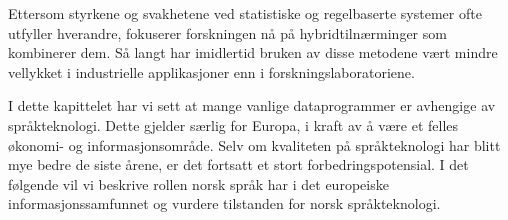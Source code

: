 \begin{multicols}{2}

Ettersom styrkene og svakhetene ved statistiske og regelbaserte systemer ofte utfyller hverandre, fokuserer forskningen nå på hybridtilnærminger som kombinerer dem. Så langt har imidlertid bruken av disse metodene vært mindre vellykket i industrielle applikasjoner enn i forskningslaboratoriene.

I dette kapittelet har vi sett at mange vanlige dataprogrammer er avhengige av språkteknologi. Dette gjelder særlig for Europa, i kraft av å være et felles økonomi- og informasjonsområde. Selv om kvaliteten på språkteknologi har blitt mye bedre de siste årene, er det fortsatt et stort forbedringspotensial. I det følgende vil vi beskrive rollen 
norsk språk har i det europeiske informasjonssamfunnet og vurdere tilstanden for norsk språkteknologi.
\end{multicols}

\clearpage


